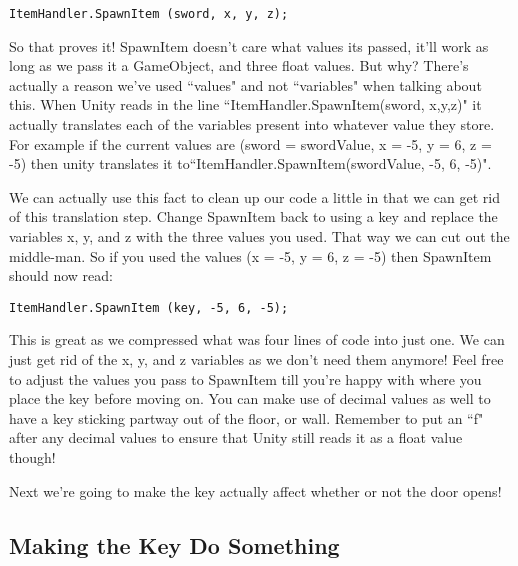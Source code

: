 \documentclass{article}
\begin{document}
\lstset{style=sharpc}
\begin{lstlisting}
ItemHandler.SpawnItem (sword, x, y, z);
\end{lstlisting}

\noindent{}

So that proves it! SpawnItem doesn't care what values its passed, it'll work as long as we pass it a GameObject, and three float values. But why? There's actually a reason we've used ``values" and not ``variables" when talking about this. When Unity reads in the line ``ItemHandler.SpawnItem(sword, x,y,z)" it actually translates each of the variables present into whatever value they store. For example if the current values are (sword = swordValue, x = -5, y = 6, z = -5) then unity translates it to``ItemHandler.SpawnItem(swordValue, -5, 6, -5)". 

We can actually use this fact to clean up our code a little in that we can get rid of this translation step. Change SpawnItem back to using a key and replace the variables x, y, and z with the three values you used. That way we can cut out the middle-man. So if you used the values (x = -5, y = 6, z = -5) then SpawnItem should now read: 

\lstset{style=sharpc}
\begin{lstlisting}
ItemHandler.SpawnItem (key, -5, 6, -5);
\end{lstlisting}

\noindent{}

This is great as we compressed what was four lines of code into just one. We can just get rid of the x, y, and z variables as we don't need them anymore! Feel free to adjust the values you pass to SpawnItem till you're happy with where you place the key before moving on. You can make use of decimal values as well to have a key sticking partway out of the floor, or wall. Remember to put an ``f" after any decimal values to ensure that Unity still reads it as a float value though! 

Next we're going to make the key actually affect whether or not the door opens!

\subsection{Making the Key Do Something}
\end{document}
